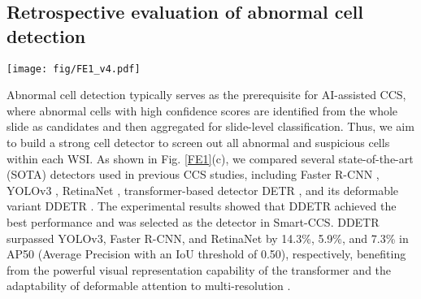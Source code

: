 \subsection*{Retrospective evaluation of abnormal cell detection}\label{subsec2-4}
\begin{figure*}[htbp]
    \centering
    \texttt{[image: fig/FE1\_v4.pdf]}
    \caption{\textbf{Performance of Smart-CCS in retrospective study.} \textbf{a.} Evaluation of cell-level cytology task using cell classification datasets,  SIPaKMeD ($N$ = 4,049), HErlev ($N$ = 918), and CCS-Cell ($N$ = 9,008). \textbf{b.} Evaluation of the WSI-level cytology task using retrospective cervical cytology datasets ($N$ = 5,189, 11,986, 8,396) to assess cancer screening (ECA) and fine-grained classification (ALL) performances. \textbf{c.} Comparison of abnormal cell detection performance among DDETR, DETR, RetinaNet, Faster R-CNN and YOLOv3 on CCS-Cell dataset. \textbf{d.} The external testing performances are evaluated by metric AUC with different settings, Base denotes the typical two-step CCS model, w/ P is introducing pretraining, w/ P\&A refers to our proposed Smart-CCS with pretraining and adaptation. \textbf{e.} Internal and external data distribution, along with the results of cervical cancer screening evaluations.}
    \label{FE1}
\end{figure*}
Abnormal cell detection typically serves as the prerequisite for AI-assisted CCS, where abnormal cells with high confidence scores are identified from the whole slide as candidates and then aggregated for slide-level classification. Thus, we aim to build a strong cell detector to screen out all abnormal and suspicious cells within each WSI. 
As shown in Fig. \ref{FE1}(c), we compared several state-of-the-art (SOTA) detectors used in previous CCS studies, including Faster R-CNN \cite{ren2015faster}, YOLOv3 \cite{zhu2021hybrid,wei2021efficient}, RetinaNet \cite{wang2024artificial}, transformer-based detector DETR \cite{carion2020end}, and its deformable variant DDETR \cite{zhu2020deformable}. 
The experimental results showed that DDETR achieved the best performance and was selected as the detector in Smart-CCS. DDETR surpassed YOLOv3, Faster R-CNN, and RetinaNet by 14.3\%, 5.9\%, and 7.3\% in AP50 (Average Precision with an IoU threshold of 0.50), respectively, benefiting from the powerful visual representation capability of the transformer and the adaptability of deformable attention to multi-resolution \cite{zhu2020deformable}.
